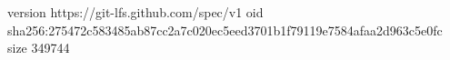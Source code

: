 version https://git-lfs.github.com/spec/v1
oid sha256:275472c583485ab87cc2a7c020ec5eed3701b1f79119e7584afaa2d963c5e0fc
size 349744
